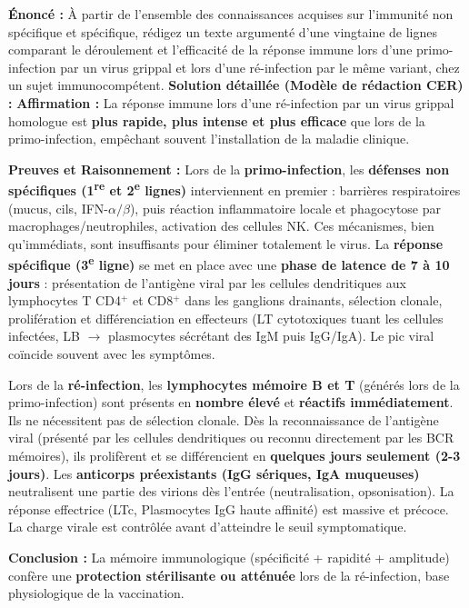 \documentclass[11pt]{article}
\begin{document}
\begin{exoresolu}
\textbf{Énoncé :} À partir de l'ensemble des connaissances acquises sur l'immunité non spécifique et spécifique, rédigez un texte argumenté d'une vingtaine de lignes comparant le déroulement et l'efficacité de la réponse immune lors d'une primo-infection par un virus grippal et lors d'une ré-infection par le même variant, chez un sujet immunocompétent.
\tcblower
\textbf{Solution détaillée (Modèle de rédaction CER) :}
\textbf{Affirmation :} La réponse immune lors d'une ré-infection par un virus grippal homologue est \textbf{plus rapide, plus intense et plus efficace} que lors de la primo-infection, empêchant souvent l'installation de la maladie clinique.

\textbf{Preuves et Raisonnement :}
Lors de la \textbf{primo-infection}, les \textbf{défenses non spécifiques (1\textsuperscript{re} et 2\textsuperscript{e} lignes)} interviennent en premier : barrières respiratoires (mucus, cils, IFN-$\alpha/\beta$), puis réaction inflammatoire locale et phagocytose par macrophages/neutrophiles, activation des cellules NK. Ces mécanismes, bien qu'immédiats, sont insuffisants pour éliminer totalement le virus. La \textbf{réponse spécifique (3\textsuperscript{e} ligne)} se met en place avec une \textbf{phase de latence de 7 à 10 jours} : présentation de l'antigène viral par les cellules dendritiques aux lymphocytes T CD4$^+$ et CD8$^+$ dans les ganglions drainants, sélection clonale, prolifération et différenciation en effecteurs (LT cytotoxiques tuant les cellules infectées, LB $\rightarrow$ plasmocytes sécrétant des IgM puis IgG/IgA). Le pic viral coïncide souvent avec les symptômes.

Lors de la \textbf{ré-infection}, les \textbf{lymphocytes mémoire B et T} (générés lors de la primo-infection) sont présents en \textbf{nombre élevé} et \textbf{réactifs immédiatement}. Ils ne nécessitent pas de sélection clonale. Dès la reconnaissance de l'antigène viral (présenté par les cellules dendritiques ou reconnu directement par les BCR mémoires), ils prolifèrent et se différencient en \textbf{quelques jours seulement (2-3 jours)}. Les \textbf{anticorps préexistants (IgG sériques, IgA muqueuses)} neutralisent une partie des virions dès l'entrée (neutralisation, opsonisation). La réponse effectrice (LTc, Plasmocytes IgG haute affinité) est massive et précoce. La charge virale est contrôlée avant d'atteindre le seuil symptomatique.

\textbf{Conclusion :} La mémoire immunologique (spécificité + rapidité + amplitude) confère une \textbf{protection stérilisante ou atténuée} lors de la ré-infection, base physiologique de la vaccination.
\end{exoresolu}
\end{document}
